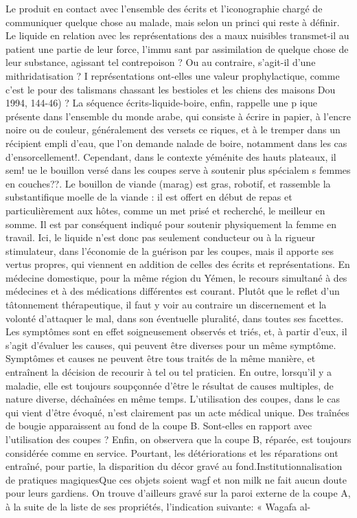 Le produit en contact avec l'ensemble des écrits et l'iconographie chargé de communiquer quelque chose au malade, mais selon un princi qui reste à définir. Le liquide en relation avec les représentations des a maux nuisibles transmet-il au patient une partie de leur force, l'immu sant par assimilation de quelque chose de leur substance, agissant tel contrepoison ? Ou au contraire, s'agit-il d'une mithridatisation ? I représentations ont-elles une valeur prophylactique, comme c'est le pour des talismans chassant les bestioles et les chiens des maisons Dou 1994, 144-46) ? La séquence écrits-liquide-boire, enfin, rappelle une p ique présente dans l'ensemble du monde arabe, qui consiste à écrire in papier, à l'encre noire ou de couleur, généralement des versets ce riques, et à le tremper dans un récipient empli d'eau, que l'on demande nalade de boire, notamment dans les cas d'ensorcellement!.
Cependant, dans le contexte yéménite des hauts plateaux, il sem! ue le bouillon versé dans les coupes serve à soutenir plus spécialem s femmes en couches??. Le bouillon de viande (marag) est gras, robotif, et rassemble la substantifique moelle de la viande : il est offert en début de repas et particulièrement aux hôtes, comme un met prisé et recherché, le meilleur en somme. Il est par conséquent indiqué pour soutenir physiquement la femme en travail. Ici, le liquide n'est donc pas seulement conducteur ou à la rigueur stimulateur, dans l'économie de la guérison par les coupes, mais il apporte ses vertus propres, qui viennent en addition de celles des écrits et représentations. En médecine domestique, pour la même région du Yémen, le recours simultané à des médecines et à des médications différentes est courant. Plutôt que le reflet d'un tâtonnement thérapeutique, il faut y voir au contraire un discernement et la volonté d'attaquer le mal, dans son éventuelle pluralité, dans toutes ses facettes. Les symptômes sont en effet soigneusement observés et triés, et, à partir d'eux, il s'agit d'évaluer les causes, qui peuvent être diverses pour un même symptôme. Symptômes et causes ne peuvent être tous traités de la même manière, et entraînent la décision de recourir à tel ou tel praticien. En outre, lorsqu'il y a maladie, elle est toujours soupçonnée d'être le résultat de causes multiples, de nature diverse, déchaînées en même temps. L'utilisation des coupes, dans le cas qui vient d'être évoqué, n'est clairement pas un acte médical unique.
Des traînées de bougie apparaissent au fond de la coupe B. Sont-elles en rapport avec l'utilisation des coupes ? Enfin, on observera que la coupe B, réparée, est toujours considérée comme en service. Pourtant, les détériorations et les réparations ont entraîné, pour partie, la disparition du décor gravé au fond.Institutionnalisation de pratiques magiquesQue ces objets soient wagf et non milk ne fait aucun doute pour leurs gardiens. On trouve d'ailleurs gravé sur la paroi externe de la coupe A, à la suite de la liste de ses propriétés, l'indication suivante: « Wagafa al-
